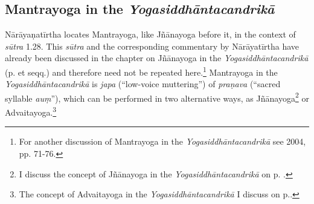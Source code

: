 \subsection{Mantrayoga in the \textit{Yogasiddhāntacandrikā}}
\label{mantrayogaintrocandrika}
Nārāyaṇatīrtha locates Mantrayoga, like Jñānayoga before it, in the context of \textit{sūtra} 1.28. This \textit{sūtra} and the corresponding commentary by Nārāyatīrtha have already been discussed in the chapter on Jñānayoga in the \textit{Yogasiddhāntacandrikā} (p.\pageref{jnanayogaintrocandrika} et seqq.) and therefore need not be repeated here.\footnote{For another discussion of Mantrayoga in the \textit{Yogasiddhāntacandrikā} see \citeauthor{penna2004} 2004, pp. 71-76.} Mantrayoga in the \textit{Yogasiddhāntacandrikā} is \textit{japa} (``low-voice muttering'') of \textit{praṇava} (``sacred syllable \textit{auṃ}''), which can be performed in two alternative ways, as Jñānayoga\footnote{I discuss the concept of Jñānayoga in the \textit{Yogasiddhāntacandrikā} on p. \pageref{jnanayogaintrocandrika}.} or Advaitayoga.\footnote{The concept of Advaitayoga in the \textit{Yogasiddhāntacandrikā} I discuss on p.\pageref{advaitayogaintrocandrika}.}      
